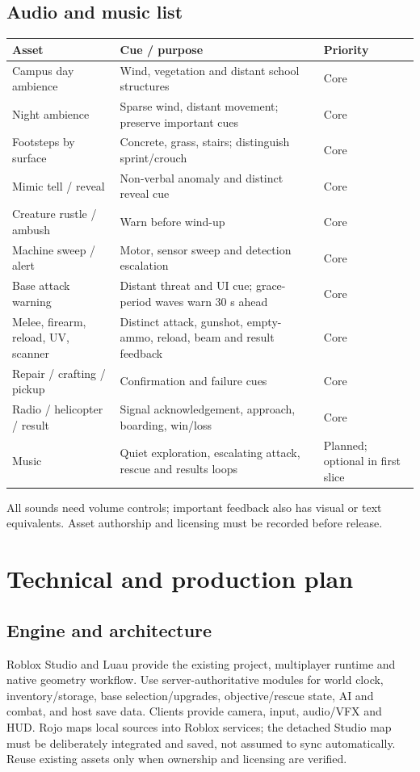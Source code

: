 \subsection{Audio and music list}
\begin{longtable}{@{}p{}p{}p{}@{}}
\toprule
\textbf{Asset} & \textbf{Cue / purpose} & \textbf{Priority} \\ \midrule\endhead
Campus day ambience & Wind, vegetation and distant school structures & Core \\
Night ambience & Sparse wind, distant movement; preserve important cues & Core \\
Footsteps by surface & Concrete, grass, stairs; distinguish sprint/crouch & Core \\
Mimic tell / reveal & Non-verbal anomaly and distinct reveal cue & Core \\
Creature rustle / ambush & Warn before wind-up & Core \\
Machine sweep / alert & Motor, sensor sweep and detection escalation & Core \\
Base attack warning & Distant threat and UI cue; grace-period waves warn 30 s ahead & Core \\
Melee, firearm, reload, UV, scanner & Distinct attack, gunshot, empty-ammo, reload, beam and result feedback & Core \\
Repair / crafting / pickup & Confirmation and failure cues & Core \\
Radio / helicopter / result & Signal acknowledgement, approach, boarding, win/loss & Core \\
Music & Quiet exploration, escalating attack, rescue and results loops & Planned; optional in first slice \\
\bottomrule
\end{longtable}
All sounds need volume controls; important feedback also has visual or text equivalents. Asset authorship and licensing must be recorded before release.


\section{Technical and production plan}

\subsection{Engine and architecture}
Roblox Studio and Luau provide the existing project, multiplayer runtime and native geometry workflow. Use server-authoritative modules for world clock, inventory/storage, base selection/upgrades, objective/rescue state, AI and combat, and host save data. Clients provide camera, input, audio/VFX and HUD. Rojo maps local sources into Roblox services; the detached Studio map must be deliberately integrated and saved, not assumed to sync automatically. Reuse existing assets only when ownership and licensing are verified.

